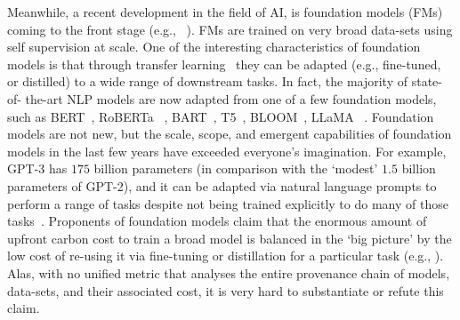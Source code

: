 Meanwhile, a recent development in the field of AI, is foundation models (FMs) coming to the front stage (e.g., ~\cite{stanford-fm}). FMs are trained on very broad data-sets using self supervision at scale. One of the interesting characteristics of foundation models is that 
through transfer learning~\cite{thrun1998lifelong} they can be adapted (e.g., fine-tuned, or distilled) to a wide range of downstream tasks.  In fact, the majority of state-of- the-art NLP models are now adapted from one of a few foundation models, such as BERT~\cite{devlin2018bert}, RoBERTa ~\cite{liu2019roberta}, BART~\cite{lewis2019bart}, T5~\cite{raffel2020exploring}, BLOOM~\cite{workshop2023bloom}, LLaMA ~\cite{touvron2023llama}. 
Foundation models are not new, but the scale, scope, and emergent capabilities of foundation models in the last few years have exceeded everyone's imagination. For example, GPT-3 has $175$ billion parameters (in comparison with the `modest' $1.5$ billion parameters of GPT-2), and it can be adapted via natural language prompts to perform a range of tasks despite not being trained explicitly to do many of those tasks~\cite{brown2020language}. Proponents of foundation models claim that the enormous amount of upfront carbon cost to train a broad model is balanced in the `big picture' by the low cost of re-using it via fine-tuning or distillation for a particular task (e.g., \cite{stanford-fm}). 
Alas, with no unified metric that analyses the entire provenance chain of models, data-sets, and their associated cost, it is very hard to substantiate or refute this claim. 

